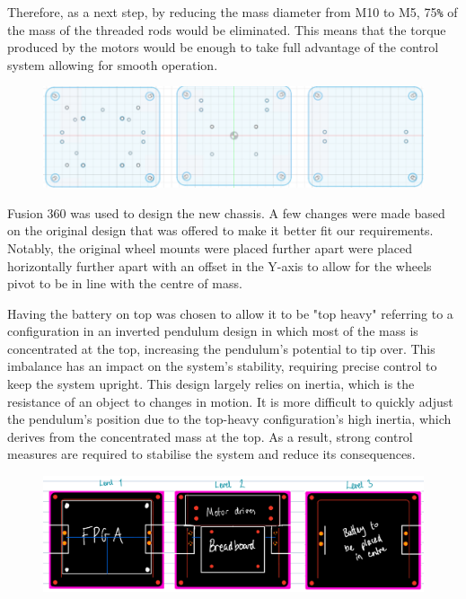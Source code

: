 Therefore, as a next step, by reducing the mass diameter from M10 to M5, 75\verb|%| of the mass of the threaded rods would be eliminated. This means that the torque produced by the motors would be enough to take full advantage of the control system allowing for smooth operation. 

\begin{figure}
    \centering
    \includegraphics[width=0.8\linewidth]{images/chassis-cad1.png}
    \caption{}
\end{figure}

Fusion 360 was used to design the new chassis. A few changes were made based on the original design that was offered to make it better fit our requirements. Notably, the original wheel mounts were placed further apart were placed horizontally further apart with an offset in the Y-axis to allow for the wheels pivot to be in line with the centre of mass. 

Having the battery on top was chosen to allow it to be "top heavy" referring to a configuration in an inverted pendulum design in which most of the mass is concentrated at the top, increasing the pendulum's potential to tip over. This imbalance has an impact on the system's stability, requiring precise control to keep the system upright. This design largely relies on inertia, which is the resistance of an object to changes in motion. It is more difficult to quickly adjust the pendulum's position due to the top-heavy configuration's high inertia, which derives from the concentrated mass at the top. As a result, strong control measures are required to stabilise the system and reduce its consequences.

\begin{figure}
    \centering
    \includegraphics[width=0.8\linewidth]{images/chassis-cad2.png}
    \caption{}
\end{figure}

